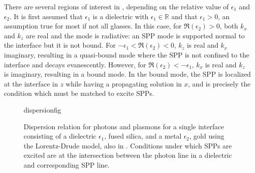 There are several regions of interest in ,
depending on the relative value of $\epsilon_1$ and $\epsilon_2$.  It is
first assumed that $\epsilon_1$ is a dielectric with
$\epsilon_1\in\mathbb{R}$ and that $\epsilon_1 > 0$, an assumption true for
most if not all glasses.  In this case, for $\Re(\epsilon_2)>0$, both $k_x$
and $k_z$ are real and the mode is radiative: an SPP mode is supported
normal to the interface but it is not bound.  For
$-\epsilon_1<\Re(\epsilon_2)<0$, $k_z$ is real and $k_x$ imaginary,
resulting in a quasi-bound mode where the SPP is not confined to the
interface and decays evanescently.  However, for
$\Re(\epsilon_2)<-\epsilon_1$, $k_x$ is real and $k_z$ is imaginary,
resulting in a bound mode.  In the bound mode, the SPP is localized at the
interface in $z$ while having a propagating solution in $x$, and is
precisely the condition which must be matched to excite SPPs.
\begin{figure}[ht]
\centering
{dispersionfig}
\caption{Dispersion relation for photons and plasmons for a single interface consisting of a dielectric $\epsilon_1$, fused silica, and a metal $\epsilon_2$, gold using the Lorentz-Drude model, also in . Conditions under which SPPs are excited are at the intersection between the photon line in a dielectric and corresponding SPP line.}
\label{fig:dispersionrelation}
\end{figure}
